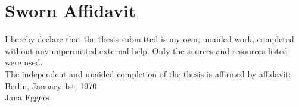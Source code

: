 
\cleardoublepage
\section*{Sworn Affidavit}

\begin{flushleft}
I hereby declare that the thesis submitted is my own, unaided work, completed without any unpermitted external help. Only the sources and resources listed were used.\\
\vspace{0.5cm}
The independent and unaided completion of the thesis is affirmed by affidavit:\\
\vspace{1.0cm}
Berlin, January 1st, 1970
\\
\vspace{3.5cm}
Jana Eggers
\end{flushleft}
